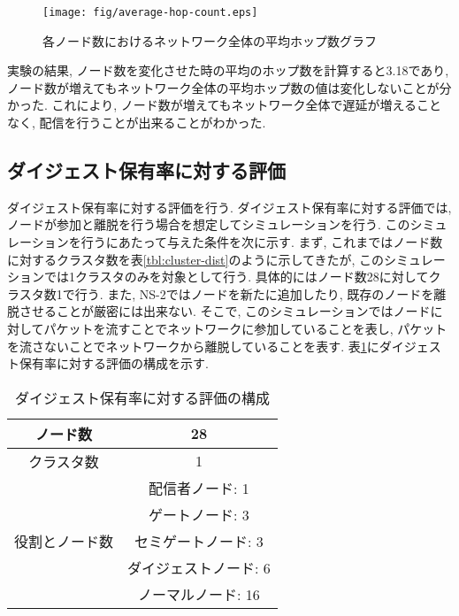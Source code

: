 \begin{figure}[h]
  \centering
  \texttt{[image: fig/average-hop-count.eps]}
  \caption{各ノード数におけるネットワーク全体の平均ホップ数グラフ}
  \label{fig:average-hop-count}
\end{figure}

実験の結果, ノード数を変化させた時の平均のホップ数を計算すると3.18であり, ノード数が増えてもネットワーク全体の平均ホップ数の値は変化しないことが分かった. これにより, ノード数が増えてもネットワーク全体で遅延が増えることなく, 配信を行うことが出来ることがわかった.

\subsection{ダイジェスト保有率に対する評価}\label{subsec:eval-digest-have}
ダイジェスト保有率に対する評価を行う. ダイジェスト保有率に対する評価では, ノードが参加と離脱を行う場合を想定してシミュレーションを行う. このシミュレーションを行うにあたって与えた条件を次に示す. まず, これまではノード数に対するクラスタ数を表\ref{tbl:cluster-dist}のように示してきたが, このシミュレーションでは1クラスタのみを対象として行う. 具体的にはノード数28に対してクラスタ数1で行う. また, NS-2ではノードを新たに追加したり, 既存のノードを離脱させることが厳密には出来ない. そこで, このシミュレーションではノードに対してパケットを流すことでネットワークに参加していることを表し, パケットを流さないことでネットワークから離脱していることを表す. 表\ref{tbl:digest-have}にダイジェスト保有率に対する評価の構成を示す.

\begin{table}[h]
  \caption{ダイジェスト保有率に対する評価の構成}
  \label{tbl:digest-have}
  \centering
      {\small
        \begin{tabular}{|c||c|} \hline
        ノード数 & 28 \\ \hline
        クラスタ数 & 1 \\ \hline
        & 配信者ノード: 1 \\ \cline{2-2}
        & ゲートノード: 3 \\ \cline{2-2}
        役割とノード数 & セミゲートノード: 3 \\ \cline{2-2}
        & ダイジェストノード: 6 \\ \cline{2-2}
        & ノーマルノード: 16 \\ \cline{2-2}
        \hline
        \end{tabular}
      }
\end{table}

